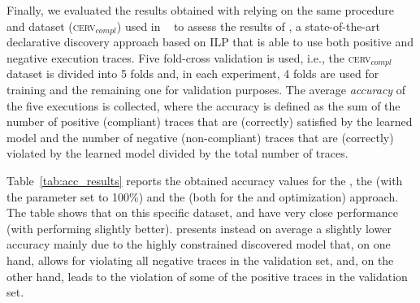 Finally, we evaluated the results obtained with \nd relying on the same procedure and dataset (\textsc{cerv$_{compl}$}) used in ~\cite{2007b-Lamma} to assess the results of \decminer, a state-of-the-art declarative discovery approach based on \ac{ILP} that is able to use both positive and negative execution traces. 
Five fold-cross validation is used, i.e., the \textsc{cerv$_{compl}$} dataset is divided into 5 folds and, in each experiment, 4 folds are used for training and the remaining one for validation purposes. The average \emph{accuracy} of the five executions is collected, where the accuracy is defined as the sum of the number of positive (compliant) traces that are (correctly) satisfied by the learned model and the number of negative (non-compliant) traces that are (correctly) violated by the learned model divided by the total number of traces. 
\begin{table} [b]
	\centering
		\caption{Accuracy results obtained with \declareminer, \decminer and \nd}
		\label{tab:acc_results}
\end{table}

Table~\ref{tab:acc_results} reports the obtained accuracy values for the \decminer, the \declareminer (with the  parameter set to 100\%) and the \nd (both for the \minclos and \subsetclos optimization) approach. The table shows that on this specific dataset, \nd and \decminer have very close performance (with \nd \minclos performing slightly better). \declareminer presents instead on average a slightly lower accuracy mainly due to the highly constrained discovered model that, on one hand, allows for violating all negative traces in the validation set, and, on the other hand, leads to the violation of some of the positive traces in the validation set.




